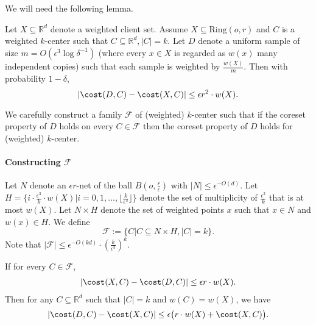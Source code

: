 We will need the following lemma.

\begin{lemma}
\label{lemma:VincentCoreset}
Let $X\subseteq \mathbb{R}^d$ denote a weighted client set. Assume $X\subseteq \mathrm{Ring}(o,r)$ and $C$ is a weighted $k$-center such that $C\subseteq \mathbb{R}^d, |C|=k$. Let $D$ denote a uniform sample of size $m=O(\epsilon^3\log \delta^{-1})$ (where every $x\in X$ is regarded as $w(x)$ many independent copies) such that each sample is weighted by $\frac{w(X)}{m}$. Then with probability $1-\delta$, $$
|\cost(D,C)-\cost(X,C)|\leq \epsilon r^2 \cdot w(X).
$$
\end{lemma}

We carefully construct a family $\mathcal{F}$ of (weighted) $k$-center such that if the coreset property of $D$ holds on every $C\in \mathcal{F}$ then the coreset property of $D$ holds for (weighted) $k$-center.


\paragraph{Constructing $\mathcal{F}$} Let $N$ denote an $\epsilon r$-net of the ball $B(o,\frac{r}{\epsilon})$ with $|N|\leq \epsilon^{-O(d)}$. Let $H=\{i\cdot  \frac{\epsilon^3}{k}\cdot w(X)|i=0,1,...,
\lfloor\frac{k}{\epsilon^3}\rfloor\}$ denote the set of multiplicity of $\frac{\epsilon^3}{k}$ that is at most $w(X)$. Let $N\times H$ denote the set of weighted points $x$ such that $x\in N$ and $w(x)\in H$.
We define $$
\mathcal{F}:=\{C|C\subseteq N\times H,|C|=k\}.
$$
Note that $|\mathcal{F}|\leq \epsilon^{-O(kd)}\cdot (\frac{k}{\epsilon^3})^k$.

\begin{lemma} \label{lemma:discrete}
If for every $C\in \mathcal{F}$, \begin{eqnarray}
|\cost(X,C)-\cost(D,C)|\leq \epsilon r\cdot w(X). \label{eqn:ring_assumption}
\end{eqnarray} Then for any $C\subseteq \mathbb{R}^d$ such that $|C|=k$ and $w(C)=w(X)$, we have $$|\cost(D,C)-\cost(X,C)|\leq \epsilon \big(r\cdot w(X)+ \cost(X,C)\big).$$
\end{lemma}

